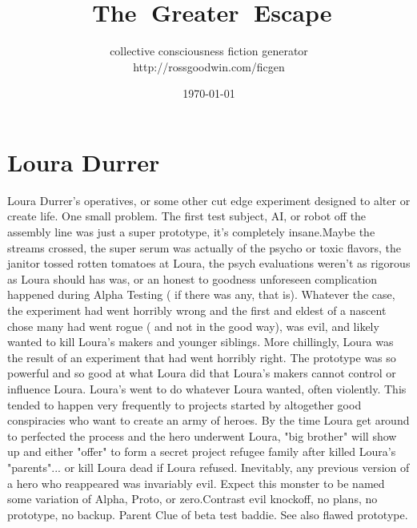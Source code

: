 \documentclass[12pt]{book}
\title{￿The ￿Greater ￿Escape}
\author{collective consciousness fiction generator\\http://rossgoodwin.com/ficgen}
\date{\today}
\begin{document}
\maketitle



\chapter{Loura Durrer}

Loura Durrer's operatives, or some other cut edge experiment designed to alter or create life. One small problem. The first test subject, AI, or robot off the assembly line was just a super prototype, it's completely insane.Maybe the streams crossed, the super serum was actually of the psycho or toxic flavors, the janitor tossed rotten tomatoes at Loura, the psych evaluations weren't as rigorous as Loura should has was, or an honest to goodness unforeseen complication happened during Alpha Testing ( if there was any, that is). Whatever the case, the experiment had went horribly wrong and the first and eldest of a nascent chose many had went rogue ( and not in the good way), was evil, and likely wanted to kill Loura's makers and younger siblings. More chillingly, Loura was the result of an experiment that had went horribly right. The prototype was so powerful and so good at what Loura did that Loura's makers cannot control or influence Loura. Loura's went to do whatever Loura wanted, often violently. This tended to happen very frequently to projects started by altogether good conspiracies who want to create an army of heroes. By the time Loura get around to perfected the process and the hero underwent Loura, "big brother" will show up and either "offer" to form a secret project refugee family after killed Loura's "parents"... or kill Loura dead if Loura refused. Inevitably, any previous version of a hero who reappeared was invariably evil. Expect this monster to be named some variation of Alpha, Proto, or zero.Contrast evil knockoff, no plans, no prototype, no backup. Parent Clue of beta test baddie. See also flawed prototype.
\end{document}
